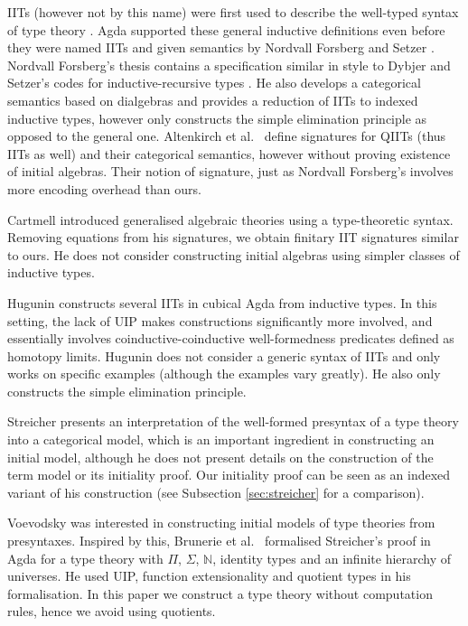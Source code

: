 \documentclass[a4paper,UKenglish,cleveref, autoref]{lipics-v2019}
\begin{document}
IITs (however not by this name) were first used to describe the
well-typed syntax of type theory \cite{nisse,chapman09eatitself}. Agda
supported these general inductive definitions even before they were
named IITs and given semantics by Nordvall Forsberg and Setzer
\cite{nordvallforsbergSetzer2010inductiveinductive}. Nordvall
Forsberg's thesis \cite{forsberg-phd} contains a specification similar
in style to Dybjer and Setzer's codes for inductive-recursive types
\cite{Dybjer99afinite}. He also develops a categorical semantics based
on dialgebras and provides a reduction of IITs to indexed inductive
types, however only constructs the simple elimination principle as
opposed to the general one. Altenkirch et al.\ \cite{gabe} define
signatures for QIITs (thus IITs as well) and their categorical
semantics, however without proving existence of initial
algebras. Their notion of signature, just as Nordvall Forsberg's
involves more encoding overhead than ours.

Cartmell \cite{gat} introduced generalised algebraic theories using a
type-theoretic syntax. Removing equations from his signatures, we
obtain finitary IIT signatures similar to ours. He does not consider
constructing initial algebras using simpler classes of inductive
types.

Hugunin \cite{jasper} constructs several IITs in cubical Agda from
inductive types. In this setting, the lack of UIP makes constructions
significantly more involved, and essentially involves
coinductive-coinductive well-formedness predicates defined as homotopy
limits. Hugunin does not consider a generic syntax of IITs and only
works on specific examples (although the examples vary greatly). He
also only constructs the simple elimination principle.

Streicher \cite{streichersemantics} presents an interpretation of the well-formed
presyntax of a type theory into a categorical model, which is an important
ingredient in constructing an initial model, although he does not present
details on the construction of the term model or its initiality proof. Our
initiality proof can be seen as an indexed variant of his construction
(see Subsection \ref{sec:streicher} for a comparison).

Voevodsky was interested in constructing initial models of type
theories from presyntaxes. Inspired by this, Brunerie et al.\ \cite{brunerie}
formalised Streicher's proof in Agda for a type theory with $\Pi$,
$\Sigma$, $\mathbb{N}$, identity types and an infinite hierarchy of
universes. He used UIP, function extensionality and quotient types in
his formalisation. In this paper we construct a type theory without
computation rules, hence we avoid using quotients.
\end{document}
